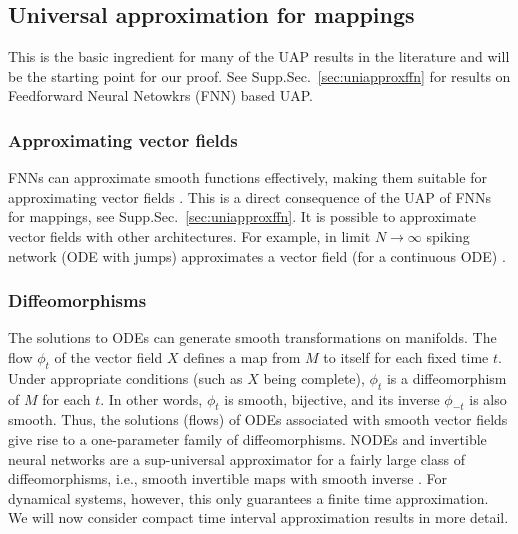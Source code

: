 \documentclass{article}
\theoremstyle{definition} \newtheorem{definition}{Definition}
\theoremstyle{remark} \newtheorem{remark}{Remark}
\newcounter{ct}
\begin{document}


\subsection{Universal approximation for mappings}\label{sec:uapmappings}
This is the basic ingredient for many of the UAP results in the literature and will be the starting point for our proof.
See Supp.Sec.~\ref{sec:uniapproxffn} for results on Feedforward Neural Netowkrs (FNN) based UAP.


\subsubsection{Approximating vector fields}\label{sec:uapvfs}
 FNNs can approximate smooth functions effectively, making them suitable for approximating vector fields \citep{doya1993universality}.
This is a direct consequence of the UAP of FNNs for mappings, see Supp.Sec.~\ref{sec:uniapproxffn}.
%
It is possible to approximate vector fields with other architectures.
For example, in limit $N\rightarrow\infty$ spiking network (ODE with jumps) approximates a vector field (for a continuous ODE) \citep{podlaski2024approximating}. 


\subsubsection{Diffeomorphisms}%
The solutions to ODEs can generate smooth transformations on manifolds.
The flow \( \phi_t \) of the vector field \( X \) defines a map from \( M \) to itself for each fixed time \( t \). Under appropriate conditions (such as \( X \) being complete), \( \phi_t \) is a diffeomorphism of \( M \) for each \( t \). In other words, \( \phi_t \) is smooth, bijective, and its inverse \( \phi_{-t} \) is also smooth.
Thus, the solutions (flows) of ODEs associated with smooth vector fields give rise to a one-parameter family of diffeomorphisms.
%
NODEs and invertible neural networks are a sup-universal approximator for a fairly large class of diffeomorphisms, i.e., smooth invertible maps with smooth inverse \citep{huang2018neural, jaini2019sum, teshima2020uap, teshima2020coupling, ishikawa2023uap, massaroli2020dissecting}.
For dynamical systems, however, this only guarantees a finite time approximation.
We will now consider compact time interval approximation results in more detail.
\end{document}
